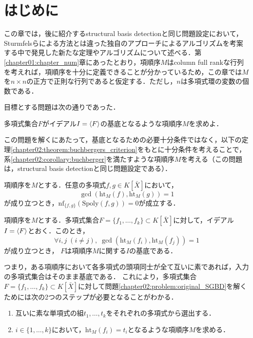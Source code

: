 \section{はじめに}
この章では，後に紹介するstructural \groebner{} basis detectionと同じ問題設定において，Sturmfelsらによる方法とは違った独自のアプローチによるアルゴリズムを考案する中で発見した新たな定理やアルゴリズムについて述べる．第\ref{chapter01:chapter_num}章にあったとおり，項順序$M$はcolumn full rankな行列を考えれば，項順序を十分に定義できることが分かっているため，この章では$M$を$n \times n$の正方で正則な行列であると仮定する．ただし，$n$は多項式環の変数の個数である．
\par
目標とする問題は次の通りであった．
\begin{problem}
	\label{chapter02:problem:original_SGBD}
	多項式集合$F$がイデアル$I = \langle F \rangle$の\groebner{}基底となるような項順序$M$を求めよ．
\end{problem}
この問題を解くにあたって，\groebner{}基底となるための必要十分条件ではなく，以下の定理\ref{chapter02:theorem:buchbergers_criterion}をもとに十分条件を考えることで，系\ref{chapter02:corollary:buchberger}を満たすような項順序$M$を考える（この問題は，structural \groebner{} basis detectionと同じ問題設定である）．
\begin{theorem}[Buchbergerの判定条件]
	\label{chapter02:theorem:buchbergers_criterion}
	項順序を$M$とする．任意の多項式$f, g \in K[\bar{X}]$において，$$\gcd(\mathrm{ht}_M(f), \mathrm{ht}_M(g))=1$$が成り立つとき，$\mathrm{nf}_{\{f, g\}}(\mathrm{Spoly}(f, g)) = 0$が成立する．
	\end{theorem}
	\begin{corollary}
	\label{chapter02:corollary:buchberger}
	項順序を$M$とする．多項式集合$F=\{ f_1, \dots, f_k \} \subset K[\bar{X}]$に対して，イデアル$I = \langle F \rangle$とおく．このとき，
	$$\forall i, j \; (i \ne j), \; \gcd(\mathrm{ht}_M(f_i), \mathrm{ht}_M(f_j))=1$$
	が成り立つとき， $F$は項順序$M$に関する$I$の\groebner{}基底である．
\end{corollary}
つまり，ある項順序において各多項式の頭項同士が全て互いに素であれば，入力の多項式集合はそのまま\groebner{}基底である．
これにより，多項式集合$F = \{f_1, \dots, f_k\}\subset K[\bar{X}]$に対して問題\ref{chapter02:problem:original_SGBD}を解くためには次の2つのステップが必要となることがわかる．
\par
\begin{enumerate}
	\item 互いに素な単項式の組$t_1, \dots, t_k$をそれぞれの多項式から選出する．
	\item $i \in \{1, \dots, k\}$において，$\mathrm{ht}_M(f_i) = t_i$となるような項順序$M$を求める．
\end{enumerate}




